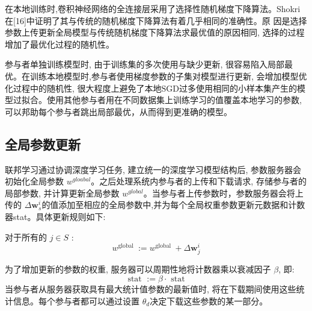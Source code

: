 在本地训练时,卷积神经网络的全连接层采用了选择性随机梯度下降算法。Shokri在[16]中证明了其与传统的随机梯度下降算法有着几乎相同的准确性。原 因是选择参数上传更新全局模型与传统随机梯度下降算法求最优值的原因相同, 选择的过程增加了最优化过程的随机性。

参与者单独训练模型时, 由于训练集的多次使用与缺少更新, 很容易陷入局部最优。在训练本地模型时,参与者使用梯度参数的子集对模型进行更新, 会增加模型优化过程中的随机性, 很大程度上避免了本地$\mathrm{SGD}$过多使用相同的小样本集产生的模型过拟合。使用其他参与者用在不同数据集上训练学习的值覆盖本地学习的参数,可以邦助每个参与者跳出局部最优，从而得到更准确的模型。

\subsection{全局参数更新}
联邦学习通过协调深度学习任务, 建立统一的深度学习模型结构后, 参数服务器会初始化全局参数 $w^{gloabal}$。之后处理系统内参与者的上传和下载请求, 存储参与者的局部参数, 并计算更新全局参数 $w^{g l o b a l}$。当参与者上传参数时，参数服务器会将上传的 $\Delta\boldsymbol{w}_{s}^{i}$的值添加至相应的全局参数中,并为每个全局权重参数更新元数据和计数器stat。具体更新规则如下:

对于所有的 $j \in S$ :
\begin{equation}\label{eq:全局参数更新1}
w^{\text {global }}:=w^{\text {global }}+\Delta \boldsymbol{w}_{j}^{i}
\end{equation}


为了增加更新的参数的权重, 服务器可以周期性地将计数器乘以衰减因子 $\beta$, 即:
\begin{equation}\label{eq:全局参数更新2}
\text { stat }:=\beta \cdot \text { stat }
\end{equation}
当参与者从服务器获取具有最大统计值参数的最新值时, 将在下载期间使用这些统计信息。每个参与者都可以通过设置 $\theta_{d}$决定下载这些参数的某一部分。


